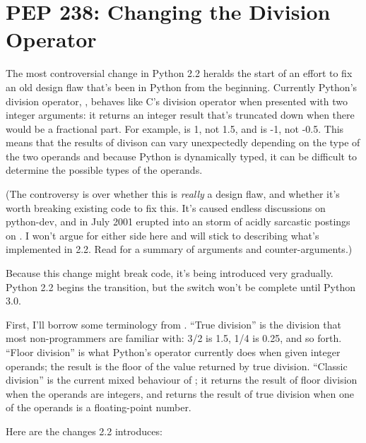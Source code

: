 \documentclass{howto}
\begin{document}
\section{PEP 238: Changing the Division Operator}

The most controversial change in Python 2.2 heralds the start of an effort
to fix an old design flaw that's been in Python from the beginning.
Currently Python's division operator, \code{/}, behaves like C's
division operator when presented with two integer arguments: it
returns an integer result that's truncated down when there would be
a fractional part.  For example,  is 1, not 1.5, and
 is -1, not -0.5.  This means that the results of divison
can vary unexpectedly depending on the type of the two operands and
because Python is dynamically typed, it can be difficult to determine
the possible types of the operands.

(The controversy is over whether this is \emph{really} a design flaw,
and whether it's worth breaking existing code to fix this.  It's
caused endless discussions on python-dev, and in July 2001 erupted into an
storm of acidly sarcastic postings on . I
won't argue for either side here and will stick to describing what's 
implemented in 2.2.  Read  for a summary of arguments and
counter-arguments.)  

Because this change might break code, it's being introduced very
gradually.  Python 2.2 begins the transition, but the switch won't be
complete until Python 3.0.

First, I'll borrow some terminology from .  ``True division'' is the
division that most non-programmers are familiar with: 3/2 is 1.5, 1/4
is 0.25, and so forth.  ``Floor division'' is what Python's \code{/}
operator currently does when given integer operands; the result is the
floor of the value returned by true division.  ``Classic division'' is
the current mixed behaviour of \code{/}; it returns the result of
floor division when the operands are integers, and returns the result
of true division when one of the operands is a floating-point number.

Here are the changes 2.2 introduces:
\end{document}
